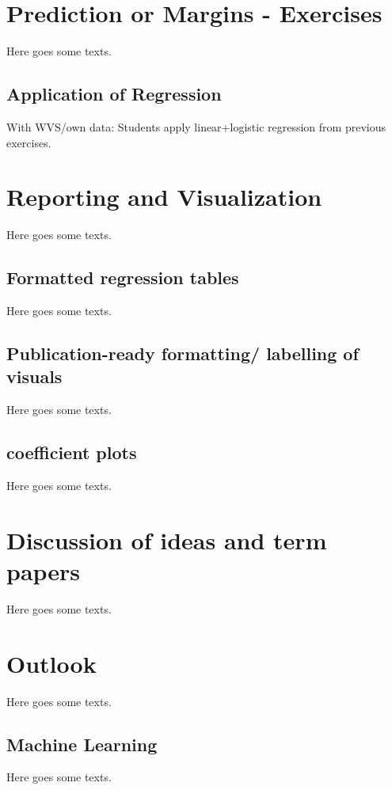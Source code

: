 \documentclass[
]{book}
\begin{document}
\hypertarget{pm-e}{%
\chapter{Prediction or Margins - Exercises}\label{pm-e}}

Here goes some texts.

\hypertarget{application-of-regression}{%
\section{Application of Regression}\label{application-of-regression}}

With WVS/own data: Students apply linear+logistic regression from previous exercises.

\hypertarget{report-v}{%
\chapter{Reporting and Visualization}\label{report-v}}

Here goes some texts.

\hypertarget{formatted-regression-tables}{%
\section{Formatted regression tables}\label{formatted-regression-tables}}

Here goes some texts.

\hypertarget{publication-ready-formatting-labelling-of-visuals}{%
\section{Publication-ready formatting/ labelling of visuals}\label{publication-ready-formatting-labelling-of-visuals}}

Here goes some texts.

\hypertarget{coefficient-plots}{%
\section{coefficient plots}\label{coefficient-plots}}

Here goes some texts.

\hypertarget{dis-paper}{%
\chapter{Discussion of ideas and term papers}\label{dis-paper}}

Here goes some texts.

\hypertarget{out-look}{%
\chapter{Outlook}\label{out-look}}

Here goes some texts.

\hypertarget{machine-learning}{%
\section{Machine Learning}\label{machine-learning}}

Here goes some texts.

  
\end{document}
